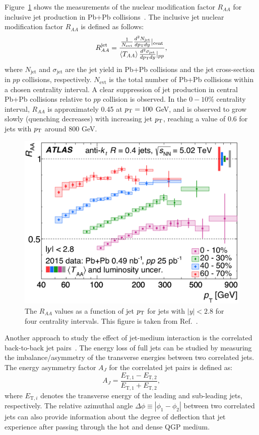 Figure~\ref{fig:intro_jet_RAA_ATLAS} shows the measurements of the nuclear modification factor $R_{AA}$ for inclusive jet production in Pb+Pb collisions~\cite{Aaboud:2018twu}. The inclusive jet nuclear modification factor $R_{AA}$ is defined as follows:
\begin{equation}
R_{AA}^\text{jet} = \frac{\frac{1}{N_\text{evt}}\frac{d^2 N_\text{jet}}{dp_\text{T} dy}|_\text{cent}}{\left\langle T_{AA}\right\rangle\frac{d^2 \sigma_\text{jet}}{dp_\text{T} dy}|_{pp}},
\end{equation}
where $N_\text{jet}$ and $\sigma_\text{jet}$ are the jet yield in Pb+Pb collisions and the jet cross-section in $pp$ collisions, respectively. $N_\text{evt}$ is the total number of Pb+Pb collisions within a chosen centrality interval. A clear suppression of jet production in central Pb+Pb collisions relative to $pp$ collision is observed. In the $0-10\%$ centrality interval, $R_{AA}$ is approximately 0.45 at $p_\text{T}=100$ GeV, and is observed to grow slowly (quenching decreases) with increasing jet $p_\text{T}$, reaching a value of 0.6 for jets with $p_\text{T}$ around 800 GeV.
\begin{figure}[H]
\centering
\includegraphics[width=.6\linewidth]{figs/chapter_intro/jet_RAA_ATLAS.png}
\caption{The $R_{AA}$ values as a function of jet $p_\text{T}$ for jets with $|y|<2.8$ for four centrality intervals. This figure is taken from Ref.~\cite{Aaboud:2018twu}.}
\label{fig:intro_jet_RAA_ATLAS}
\end{figure}

Another approach to study the effect of jet-medium interaction is the correlated back-to-back jet pairs~\cite{Qin:2015srf}. The energy loss of full jets can be studied by measuring the imbalance/asymmetry of the transverse energies between two correlated jets. The energy asymmetry factor $A_J$ for the correlated jet pairs is defined as:
\begin{equation}
A_J = \frac{E_{\text{T},1}-E_{\text{T},2}}{E_{\text{T},1}+E_{\text{T},2}},
\end{equation}
where $E_{\text{T}, i}$ denotes the transverse energy of the leading and sub-leading jets, respectively. The relative azimuthal angle $\Delta\phi \equiv |\phi_1 - \phi_2|$ between two correlated jets can also provide information about the degree of deflection that jet experience after passing through the hot and dense QGP medium.

